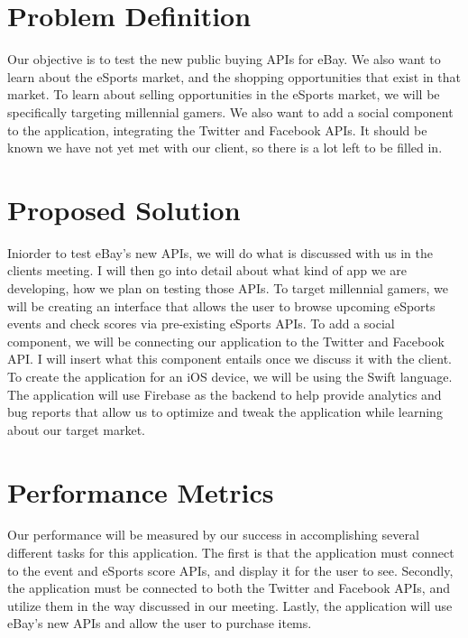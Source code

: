 \documentclass[onecolumn, draftclsnofoot,10pt, compsoc]{IEEEtran}
\begin{document}
\begin{titlepage}
\begin{singlespace}
\begin{abstract}
        \end{abstract}     
    \end{singlespace}
\end{titlepage}
\newpage
{}
\clearpage

\section{Problem Definition}
	Our objective is to test the new public buying APIs for eBay. We also want to learn about the eSports market, and the shopping opportunities that exist in that market. To learn about selling opportunities in the eSports market, we will be specifically targeting millennial gamers. We also want to add a social component to the application, integrating the Twitter and Facebook APIs. It should be known we have not yet met with our client, so there is a lot left to be filled in.

\section{Proposed Solution}
Iniorder to test eBay’s new APIs, we will do what is discussed with us in the clients meeting. I will then go into detail about what kind of app we are developing, how we plan on testing those APIs. To target millennial gamers, we will be creating an interface that allows the user to browse upcoming eSports events and check scores via pre-existing eSports APIs. To add a social component, we will be connecting our application to the Twitter and Facebook API. I will insert what this component entails once we discuss it with the client. To create the application for an iOS device, we will be using the Swift language. The application will use Firebase as the backend to help provide analytics and bug reports that allow us to optimize and tweak the application while learning about our target market.

\section{Performance Metrics}
Our performance will be measured by our success in accomplishing several different tasks for this application. The first is that the application must connect to the event and eSports score APIs, and display it for the user to see. Secondly, the application must be connected to both the Twitter and Facebook APIs, and utilize them in the way discussed in our meeting. Lastly, the application will use eBay’s new APIs and allow the user to purchase items.
\end{document}
